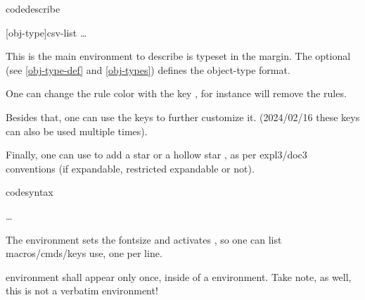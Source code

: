 \documentclass{article}
\begin{document}
\begin{codedescribe}[env,new=2023/05/01,update=2023/05/01,note={this is an example},update=2024/02/16]{codedescribe}
\begin{codesyntax}
\tsmacro{\begin{codedescribe}}[obj-type]{csv-list}
\ldots
\tsmacro{\end{codedescribe}}{}
\end{codesyntax}
This is the main environment to describe    is typeset in the margin. The optional  (see \ref{obj-type-def} and \ref{obj-types}) defines the object-type format. 
\end{codedescribe}
\begin{tsremark}[Note~1:]
One can change the rule color with the key , for instance \tsmacro{\begin{codedescribe}[rulecolor=white]}{} will remove the rules.
\end{tsremark}
\begin{tsremark}[Note~2:]
Besides that, one can use the keys  to further customize it. (2024/02/16 these keys can also be used multiple times).
\end{tsremark}
\begin{tsremark}[Note~3:]
Finally, one can use  to add a star  or a hollow star , as per expl3/doc3 conventions (if expandable, restricted expandable or not).
\end{tsremark}

\begin{codedescribe}[env]{codesyntax}
\begin{codesyntax}
\tsmacro{\begin{codesyntax}}{}
\ldots
\tsmacro{\end{codesyntax}}{}
\end{codesyntax}
The  environment sets the fontsize and activates \tsmacro{\obeylines,\obeyspaces}{}, so one can list macros/cmds/keys use, one per line.
\end{codedescribe}

\begin{tsremark*}
 environment shall appear only once, inside of a  environment. Take note, as well, this is not a verbatim environment!
\end{tsremark*}
\end{document}
